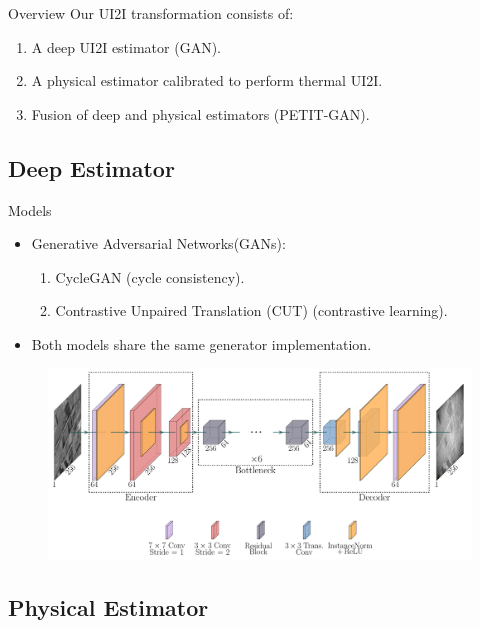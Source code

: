 
\begin{frame}{Overview}
  Our UI2I transformation consists of:
  \begin{enumerate}
    \item A deep UI2I estimator (GAN).
    \item A physical estimator calibrated to perform thermal UI2I.
    \item Fusion of deep and physical estimators (PETIT-GAN).
  \end{enumerate}
\end{frame}

\subsection{Deep Estimator}
\begin{frame}{Models}
  \begin{itemize}
    \item Generative Adversarial Networks(GANs):
    \begin{enumerate}
      \item CycleGAN \cite{CycleGAN2017} (cycle consistency).
      \item Contrastive Unpaired Translation (CUT) \cite{park2020cut} (contrastive learning).
    \end{enumerate}
    \item Both models share the same generator implementation.
  \end{itemize}
  \begin{figure}
    \centering
    \includegraphics[width=0.7\linewidth]{../figs/network/src/cut.pdf}
  \end{figure}
\end{frame}

\subsection{Physical Estimator}

